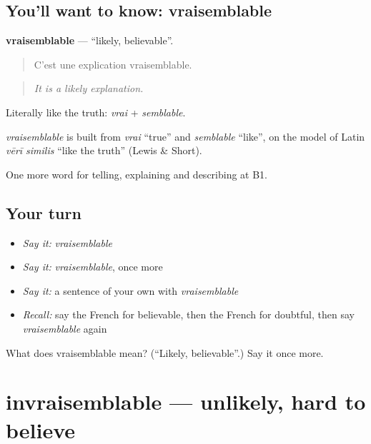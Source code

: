 \subsection*{You'll want to know: vraisemblable}
\textbf{vraisemblable} — \textquotedblleft{}likely, believable\textquotedblright{}.

\begin{quote}
C'est une explication vraisemblable.
\end{quote}

\begin{quote}
\emph{It is a likely explanation.}
\end{quote}

Literally like the truth: \emph{vrai} + \emph{semblable}.

\begin{cousinweb}
\emph{vraisemblable} is built from \emph{vrai} \textquotedblleft{}true\textquotedblright{} and \emph{semblable} \textquotedblleft{}like\textquotedblright{}, on the model of Latin \emph{vērī similis} \textquotedblleft{}like the truth\textquotedblright{} (Lewis \& Short).
\end{cousinweb}

\begin{grammarlens}[title={What you've built}]
One more word for telling, explaining and describing at B1.
\end{grammarlens}

\subsection*{Your turn}
\begin{itemize}
\raggedright
  \item \emph{Say it:} \emph{vraisemblable}
  \item \emph{Say it:} \emph{vraisemblable}, once more
  \item \emph{Say it:} a sentence of your own with \emph{vraisemblable}
  \item \emph{Recall:} say the French for believable, then the French for doubtful, then say \emph{vraisemblable} again
\end{itemize}

\begin{tcolorbox}[breakable,colback=teal!4,colframe=teal!35!black,title={Before you move on}]
What does vraisemblable mean? (\textquotedblleft{}Likely, believable\textquotedblright{}.) Say it once more.
\end{tcolorbox}
\section[invraisemblable]{invraisemblable — unlikely, hard to believe}

